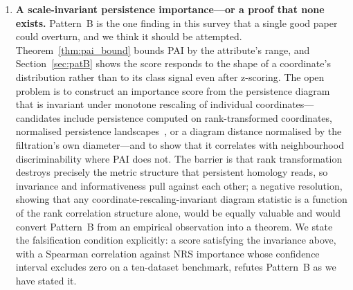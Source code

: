 \begin{enumerate}
\item \textbf{A scale-invariant persistence importance---or a proof that
none exists.}
Pattern~B is the one finding in this survey that a single good paper could
overturn, and we think it should be attempted.  Theorem~\ref{thm:pai_bound}
bounds PAI by the attribute's range, and Section~\ref{sec:patB} shows the
score responds to the shape of a coordinate's distribution rather than to
its class signal even after z-scoring.  The open problem is to construct an
importance score from the persistence diagram that is invariant under
monotone rescaling of individual coordinates---candidates include
persistence computed on rank-transformed coordinates, normalised persistence
landscapes~\cite{Bubenik2015landscapes}, or a diagram distance normalised by
the filtration's own diameter---and to show that it correlates with
neighbourhood discriminability where PAI does not.  The barrier is that
rank transformation destroys precisely the metric structure that persistent
homology reads, so invariance and informativeness pull against each other; a
negative resolution, showing that any coordinate-rescaling-invariant
diagram statistic is a function of the rank correlation structure alone,
would be equally valuable and would convert Pattern~B from an empirical
observation into a theorem.  We state the falsification condition
explicitly: a score satisfying the invariance above, with a Spearman
correlation against NRS importance whose confidence interval excludes zero
on a ten-dataset benchmark, refutes Pattern~B as we have stated it.

\end{enumerate}
